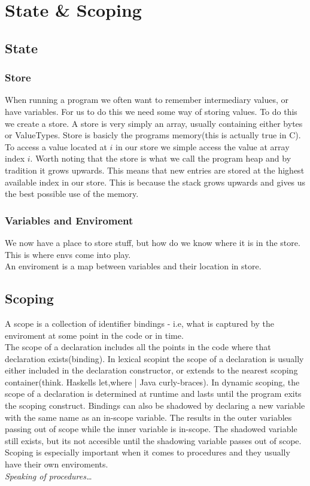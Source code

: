 \documentclass{article}
\begin{document}
    \section{State \& Scoping}
        \subsection{State}
        \subsubsection{Store}
        When running a program we often want to remember intermediary values, or have variables. For us to do this we need some way of storing values.
        To do this we create a \gls{store}. A store is very simply an array, usually containing either bytes or ValueTypes. 
        Store is basicly the programs memory(this is actually true in C). To access a value located at $i$ in our store we simple access the value at array index $i$.
        Worth noting that the store is what we call the program heap and by tradition it grows upwards. This means that new entries are stored at the highest available index in our store.
        This is because the stack grows upwards and gives us the best possible use of the memory.
        \subsubsection{Variables and Enviroment}
        We now have  a place to store stuff, but how do we know where it is in the store. This is where \glspl{env} come into play.\\
        An enviroment is a map between variables and their location in store. 
        \subsection{Scoping}
        A \gls{scope} is a collection of identifier bindings - i.e, what is captured by the enviroment at some point in the code or in time.\\
        The scope of a declaration includes all the points in the code where that declaration exists(binding). In lexical scopint the
        scope of a declaration is usually either included in the declaration constructor, or extends to the nearest scoping container(think. Haskells let,where | Java curly-braces).
        In dynamic scoping, the scope of a declaration is determined at runtime and lasts until the program exits the scoping construct.
        Bindings can also be shadowed by declaring a new variable with the same name as an in-scope variable. 
        The results in the outer variables passing out of scope while the inner variable is in-scope.
        The shadowed variable still exists, but its not accesible until the shadowing variable passes out of scope.\\
        Scoping is especially important when it comes to procedures and they usually have their own enviroments.\\
        \textit{Speaking of procedures\dots}
\end{document}
